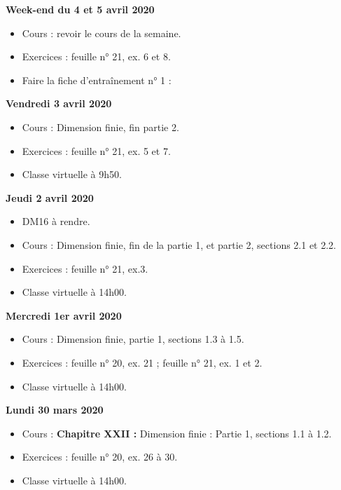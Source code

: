 \documentclass[12pt,a4paper]{article}
\begin{document}
\noindent\textbf{Week-end du 4 et 5 avril 2020}
\begin{itemize}
\item Cours : revoir le cours de la semaine.
\item Exercices : feuille n° 21, ex. 6 et 8.
\item Faire la fiche d'entraînement n° 1 : 
\vspace{.4cm}
\end{itemize}

\noindent\textbf{\bf Vendredi 3 avril 2020}
\begin{itemize}
\item Cours : Dimension finie, fin partie 2.
\item Exercices : feuille n° 21, ex. 5 et 7.
\item Classe virtuelle à 9h50.\vspace{.4cm}
\end{itemize}

\noindent\textbf{Jeudi 2 avril 2020}
\begin{itemize}
\item DM16 à rendre.
\item Cours : Dimension finie, fin de la partie 1, et partie 2, sections 2.1 et 2.2.
\item Exercices : feuille n° 21, ex.3.
\item Classe virtuelle à 14h00.\vspace{.4cm}
\end{itemize}

\noindent\textbf{Mercredi 1er avril 2020}
\begin{itemize}
\item Cours : Dimension finie, partie 1, sections 1.3 à 1.5.
\item Exercices : feuille n° 20, ex. 21 ; feuille n° 21, ex. 1 et 2.
\item Classe virtuelle à 14h00.\vspace{.4cm}
\end{itemize}

\noindent\textbf{\bf Lundi 30 mars 2020}
\begin{itemize}
\item Cours : \textbf{Chapitre XXII :} Dimension finie : Partie 1, sections 1.1 à 1.2.
\item Exercices : feuille n° 20, ex. 26 à 30.
\item Classe virtuelle à 14h00.\vspace{.4cm}
\end{itemize}
\end{document}
